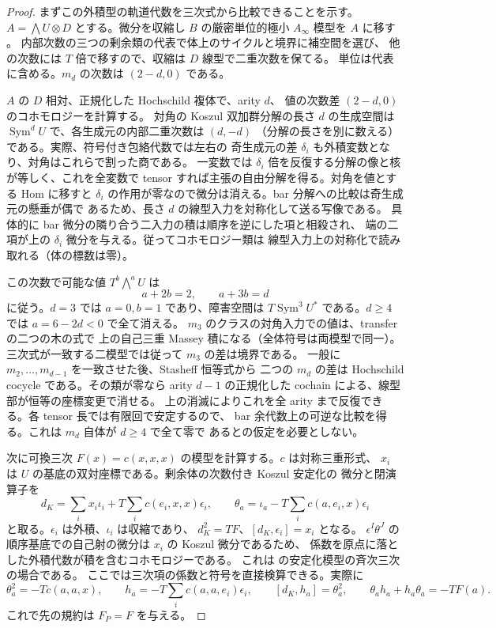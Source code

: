 \begin{proof}
まずこの外積型の軌道代数を三次式から比較できることを示す。
$A=\bigwedge U\otimes D$ とする。微分を収縮し $B$ の厳密単位的極小
$A_\infty$ 模型を $A$ に移す
\cite[Sections~3.3, 3.5 and~7]{COGKellerInfinity}。
内部次数の三つの剰余類の代表で体上のサイクルと境界に補空間を選び、
他の次数には $T$ 倍で移すので、収縮は $D$ 線型で二重次数を保てる。
単位は代表に含める。$m_d$ の次数は $(2-d,0)$ である。

$A$ の $D$ 相対、正規化した Hochschild 複体で、arity $d$、
値の次数差 $(2-d,0)$ のコホモロジーを計算する。
対角の Koszul 双加群分解の長さ $d$ の生成空間は
$\operatorname{Sym}^d U$ で、各生成元の内部二重次数は $(d,-d)$
（分解の長さを別に数える）である。実際、符号付き包絡代数では左右の
奇生成元の差 $\delta_i$ も外積変数となり、対角はこれらで割った商である。
一変数では $\delta_i$ 倍を反復する分解の像と核が等しく、これを全変数で
tensor すれば主張の自由分解を得る。対角を値とする Hom に移すと $\delta_i$
の作用が零なので微分は消える。bar 分解への比較は奇生成元の懸垂が偶で
あるため、長さ $d$ の線型入力を対称化して送る写像である。
具体的に bar 微分の隣り合う二入力の積は順序を逆にした項と相殺され、
端の二項が上の $\delta_i$ 微分を与える。従ってコホモロジー類は
線型入力上の対称化で読み取れる（体の標数は零）。

この次数で可能な値 $T^b\bigwedge^a U$ は
\[
                     a+2b=2,\qquad a+3b=d
\]
に従う。$d=3$ では $a=0,b=1$ であり、障害空間は
$T\operatorname{Sym}^3 U^*$ である。$d\ge4$ では $a=6-2d<0$ で全て消える。
$m_3$ のクラスの対角入力での値は、transfer の二つの木の式で
上の自己三重 Massey 積になる（全体符号は両模型で同一）。
三次式が一致する二模型では従って $m_3$ の差は境界である。
一般に $m_2,\ldots,m_{d-1}$ を一致させた後、Stasheff 恒等式から
二つの $m_d$ の差は Hochschild cocycle である。その類が零なら
arity $d-1$ の正規化した cochain による、線型部が恒等の座標変更で消せる。
上の消滅によりこれを全 arity まで反復できる。各 tensor 長では有限回で安定するので、
bar 余代数上の可逆な比較を得る。これは $m_d$ 自体が $d\ge4$ で全て零で
あるとの仮定を必要としない。

次に可換三次 $F(x)=c(x,x,x)$ の模型を計算する。$c$ は対称三重形式、
$x_i$ は $U$ の基底の双対座標である。剰余体の次数付き Koszul 安定化の
微分と閉演算子を
\[
 d_K=\sum_i x_i\iota_i+T\sum_i c(e_i,x,x)\epsilon_i,\qquad
 \theta_a=\iota_a-T\sum_i c(a,e_i,x)\epsilon_i
\]
と取る。$\epsilon_i$ は外積、$\iota_i$ は収縮であり、
$d_K^2=TF$、$[d_K,\epsilon_i]=x_i$ となる。
$\epsilon^I\theta^J$ の順序基底での自己射の微分は $x_i$ の Koszul 微分であるため、
係数を原点に落とした外積代数が積を含むコホモロジーである。
これは \cite[Theorems~4.1, 5.9]{ROGDyckerhoff}の安定化模型の斉次三次の場合である。
ここでは三次項の係数と符号を直接検算できる。実際に
\[
 \theta_a^2=-T c(a,a,x),\qquad
 h_a=-T\sum_i c(a,a,e_i)\epsilon_i,\qquad
 [d_K,h_a]=\theta_a^2,\qquad \theta_a h_a+h_a\theta_a=-TF(a).
\]
これで先の規約は $F_P=F$ を与える。


\end{proof}
